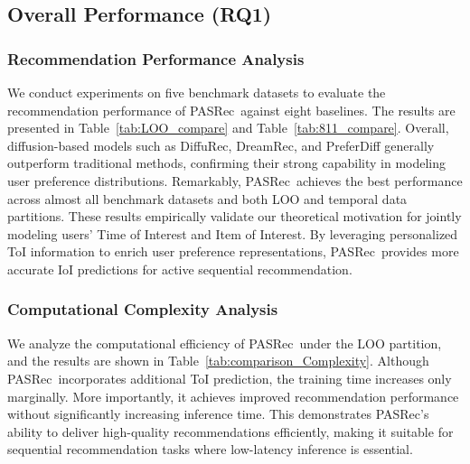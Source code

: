 \documentclass[sigconf,nonacm]{acmart}
\newcommand{\modelname}{PASRec}
\begin{document}
\subsection{Overall Performance (RQ1)}
\subsubsection{Recommendation Performance Analysis} 
We conduct experiments on five benchmark datasets to evaluate the recommendation performance of \modelname\ against eight baselines. The results are presented in Table~\ref{tab:LOO_compare} and Table~\ref{tab:811_compare}. Overall, diffusion-based models such as DiffuRec, DreamRec, and PreferDiff generally outperform traditional methods, confirming their strong capability in modeling user preference distributions. Remarkably, \modelname\ achieves the best performance across almost all benchmark datasets and both LOO and temporal data partitions. These results empirically validate our theoretical motivation for jointly modeling users’ Time of Interest and Item of Interest. By leveraging personalized ToI information to enrich user preference representations, \modelname\ provides more accurate IoI predictions for active sequential recommendation.


\subsubsection{Computational Complexity Analysis}
We analyze the computational efficiency of \modelname\ under the LOO partition, and the results are shown in Table~\ref{tab:comparison_Complexity}. Although \modelname\ incorporates additional ToI prediction, the training time increases only marginally. More importantly, it achieves improved recommendation performance without significantly increasing inference time. This demonstrates \modelname's ability to deliver high-quality recommendations efficiently, making it suitable for sequential recommendation tasks where low-latency inference is essential.
\end{document}
